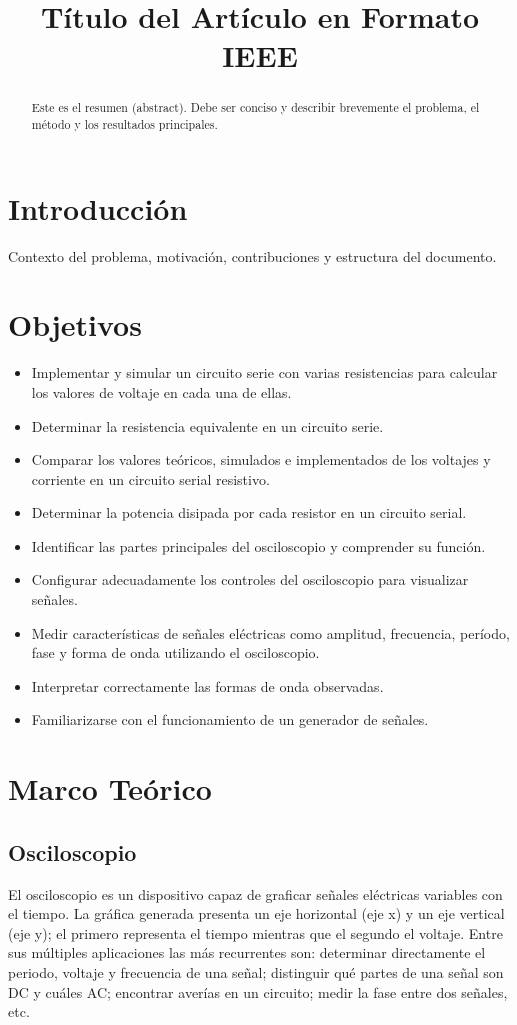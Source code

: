 \documentclass[conference]{IEEEtran} %
\title{Título del Artículo en Formato IEEE}
\author{
\IEEEauthorblockN{Nombre Apellido\IEEEauthorrefmark{1}, Nombre Apellido\IEEEauthorrefmark{2}}
\IEEEauthorblockA{\IEEEauthorrefmark{1}Afiliación 1 \\
Email: autor1@ejemplo.com}
\IEEEauthorblockA{\IEEEauthorrefmark{2}Afiliación 2 \\
Email: autor2@ejemplo.com}
}
\begin{document}
\maketitle

\begin{abstract}
Este es el resumen (abstract). Debe ser conciso y describir brevemente el problema, el método y los resultados principales.
\end{abstract}


\section{Introducción}
Contexto del problema, motivación, contribuciones y estructura del documento.

\section{Objetivos}
\begin{itemize}
  \item Implementar y simular un circuito serie con varias resistencias para calcular los valores de voltaje en cada una de ellas.
  \item Determinar la resistencia equivalente en un circuito serie.
  \item Comparar los valores te\'oricos, simulados e implementados de los voltajes y corriente en un circuito serial resistivo.
  \item Determinar la potencia disipada por cada resistor en un circuito serial.
  \item Identificar las partes principales del osciloscopio y comprender su funci\'on.
  \item Configurar adecuadamente los controles del osciloscopio para visualizar se\~nales.
  \item Medir caracter\'isticas de se\~nales el\'ectricas como amplitud, frecuencia, per\'iodo, fase y forma de onda utilizando el osciloscopio.
  \item Interpretar correctamente las formas de onda observadas.
  \item Familiarizarse con el funcionamiento de un generador de se\~nales.
\end{itemize}


\section{Marco Teórico}
\subsection{Osciloscopio}
El osciloscopio es un dispositivo capaz de graficar señales eléctricas variables con el tiempo. La gráfica generada presenta un eje horizontal (eje x) y un eje vertical (eje y); el primero representa el tiempo mientras que el segundo el voltaje. Entre sus múltiples aplicaciones las más recurrentes son: determinar directamente el periodo, voltaje y frecuencia de una señal; distinguir qué partes de una señal son DC y cuáles AC; encontrar averías en un circuito; medir la fase entre dos señales, etc.~\cite{ugrOsciloscopio}
\end{document}
